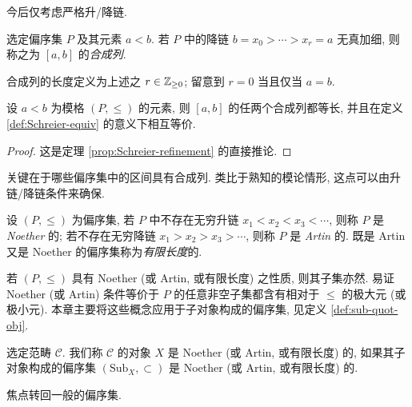 今后仅考虑严格升/降链.

\begin{definition}
	选定偏序集 $P$ 及其元素 $a < b$. 若 $P$ 中的降链 $b = x_0 > \cdots > x_r = a$ 无真加细, 则称之为 $[a, b]$ 的\emph{合成列}.
\end{definition}

合成列的长度定义为上述之 $r \in \mathbb{Z}_{\geq 0}$; 留意到 $r=0$ 当且仅当 $a=b$. 

\begin{theorem}\label{prop:lattice-JH}
	设 $a < b$ 为模格 $(P, \leq)$ 的元素, 则 $[a, b]$ 的任两个合成列都等长, 并且在定义 \ref{def:Schreier-equiv} 的意义下相互等价. 
\end{theorem}
\begin{proof}
	这是定理 \ref{prop:Schreier-refinement} 的直接推论.
\end{proof}

关键在于哪些偏序集中的区间具有合成列. 类比于熟知的模论情形, 这点可以由升链/降链条件来确保.

\begin{definition}\label{def:lattice-Noether-Artin}
	设 $(P, \leq)$ 为偏序集, 若 $P$ 中不存在无穷升链 $x_1 < x_2 < x_3 < \cdots$, 则称 $P$ 是 \emph{Noether} 的; 若不存在无穷降链 $x_1 > x_2 > x_3 > \cdots$, 则称 $P$ 是 \emph{Artin} 的. 既是 Artin 又是 Noether 的偏序集称为\emph{有限长度}的.
\end{definition}

若 $(P, \leq)$ 具有 Noether (或 Artin, 或有限长度) 之性质, 则其子集亦然. 易证 Noether (或 Artin) 条件等价于 $P$ 的任意非空子集都含有相对于 $\leq$ 的极大元 (或极小元). 本章主要将这些概念应用于子对象构成的偏序集, 见定义 \ref{def:sub-quot-obj}.

\begin{definition}\label{def:finite-length-object}
	选定范畴 $\mathcal{C}$. 我们称 $\mathcal{C}$ 的对象 $X$ 是 Noether (或 Artin, 或有限长度) 的, 如果其子对象构成的偏序集 $(\mathrm{Sub}_X, \subset)$ 是 Noether (或 Artin, 或有限长度) 的.
\end{definition}

焦点转回一般的偏序集.

